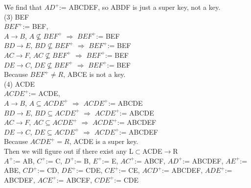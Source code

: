 \documentclass[]{article}
\begin{document}
	We find that $AD^{+}$:= ABCDEF, so ABDF is just a super key, not a key.  \\
	
	(3) BEF    \\
	
	$BEF^{+}$:= BEF,   \\
	
	$A\rightarrow B$, $A\not\subseteq BEF^{+}$ $\Longrightarrow$ $BEF^{+}$:= BEF \\
	
	$BD\rightarrow E$, $BD\not\subseteq BEF^{+}$ $\Longrightarrow$ $BEF^{+}$:= BEF \\
	
	$AC\rightarrow F$, $AC\not\subseteq BEF^{+}$  $\Longrightarrow$ $BEF^{+}$:= BEF \\
	
	$DE\rightarrow C$, $DE\not\subseteq BEF^{+}$  $\Longrightarrow$ $BEF^{+}$:= BEF \\
	
	Because $BEF^{+}\ne R$, ABCE is not a key.  \\
	
	(4) ACDE   \\
	
	$ACDE^{+}$:= ACDE,   \\
	
	$A\rightarrow B$, $A\subseteq ACDE^{+}$ $\Longrightarrow$ $ACDE^{+}$:= ABCDE \\
	
	$BD\rightarrow E$, $BD\subseteq ACDE^{+}$ $\Longrightarrow$ $ACDE^{+}$:= ABCDE \\
	
	$AC\rightarrow F$, $AC\subseteq ACDE^{+}$  $\Longrightarrow$ $ACDE^{+}$:= ABCDEF \\
	
	$DE\rightarrow C$, $DE\subseteq ACDE^{+}$  $\Longrightarrow$ $ACDE^{+}$:= ABCDEF \\
	
	Because $ACDE^{+} = R$, ACDE is a super key.  \\
	
	Then we will figure out if there exist any L$\subset$ACDE$\rightarrow$R  \\
		
	$A^{+}$:= AB, $C^{+}$:= C, $D^{+}$:= B, $E^{+}$:= E, $AC^{+}$:= ABCF, $AD^{+}$:= ABCDEF, $AE^{+}$:= ABE, $CD^{+}$:= CD, $DE^{+}$:= CDE, $CE^{+}$:= CE, $ACD^{+}$:= ABCDEF, $ADE^{+}$:= ABCDEF, $ACE^{+}$:= ABCEF, $CDE^{+}$:= CDE   \\
	
\end{document}
